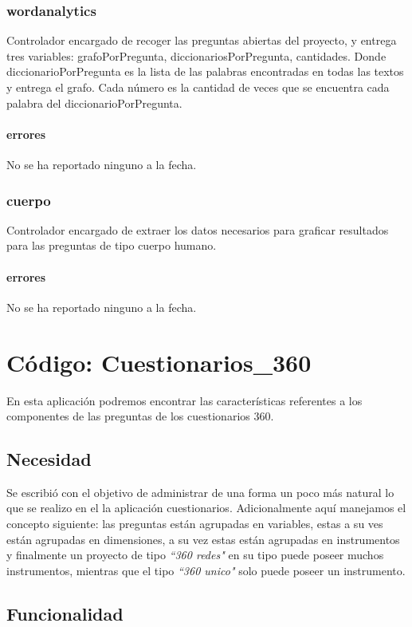 \documentclass[10pt,a4paper]{book}
\begin{document}
	\subsection{wordanalytics}
	Controlador encargado de recoger las preguntas abiertas del proyecto, y entrega tres variables: grafoPorPregunta, diccionariosPorPregunta, cantidades. Donde diccionarioPorPregunta es la lista de las palabras encontradas en todas las textos y entrega el grafo. Cada número es la cantidad de veces que se encuentra cada palabra del diccionarioPorPregunta.
	\subsubsection{errores}
	No se ha reportado ninguno a la fecha.

	\subsection{cuerpo}
	Controlador encargado de extraer los datos necesarios para graficar resultados para las preguntas de tipo cuerpo humano.
	\subsubsection{errores}
	No se ha reportado ninguno a la fecha.


	\chapter{Código: Cuestionarios\_360}

	En esta aplicación podremos encontrar las características referentes a los componentes de las preguntas de los cuestionarios 360.

	\section{Necesidad}

	Se escribió con el objetivo de administrar de una forma un poco más natural lo que se realizo en el la aplicación cuestionarios. Adicionalmente aquí manejamos el concepto siguiente: las preguntas están agrupadas en variables, estas a su ves están agrupadas en dimensiones, a su vez estas están agrupadas en instrumentos y finalmente un proyecto de tipo \textit{``360 redes"} en su tipo puede poseer muchos instrumentos, mientras que el tipo \textit{``360 unico"} solo puede poseer un instrumento.

	\section{Funcionalidad}
\end{document}
